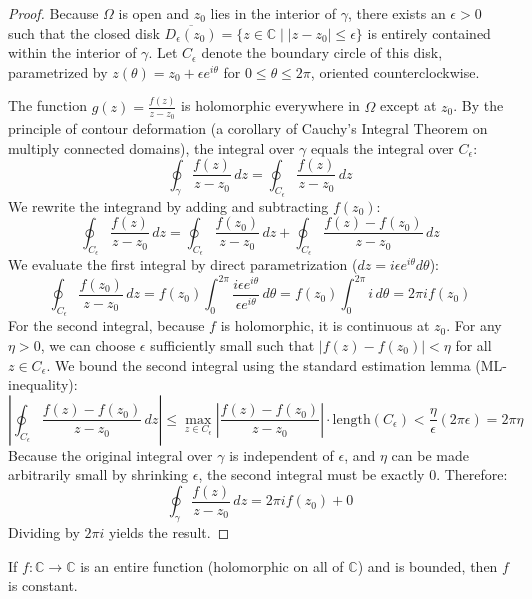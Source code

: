 \begin{proof}
Because $\Omega$ is open and $z_0$ lies in the interior of $\gamma$, there exists an $\epsilon > 0$ such that the closed disk $\overline{D_\epsilon(z_0)} = \{ z \in \mathbb{C} \mid |z - z_0| \le \epsilon \}$ is entirely contained within the interior of $\gamma$. Let $C_\epsilon$ denote the boundary circle of this disk, parametrized by $z(\theta) = z_0 + \epsilon e^{i\theta}$ for $0 \le \theta \le 2\pi$, oriented counterclockwise.

The function $g(z) = \frac{f(z)}{z - z_0}$ is holomorphic everywhere in $\Omega$ except at $z_0$. By the principle of contour deformation (a corollary of Cauchy's Integral Theorem on multiply connected domains), the integral over $\gamma$ equals the integral over $C_\epsilon$:
$$ \oint_\gamma \frac{f(z)}{z - z_0} \, dz = \oint_{C_\epsilon} \frac{f(z)}{z - z_0} \, dz $$
We rewrite the integrand by adding and subtracting $f(z_0)$:
$$ \oint_{C_\epsilon} \frac{f(z)}{z - z_0} \, dz = \oint_{C_\epsilon} \frac{f(z_0)}{z - z_0} \, dz + \oint_{C_\epsilon} \frac{f(z) - f(z_0)}{z - z_0} \, dz $$
We evaluate the first integral by direct parametrization ($dz = i \epsilon e^{i\theta} d\theta$):
$$ \oint_{C_\epsilon} \frac{f(z_0)}{z - z_0} \, dz = f(z_0) \int_0^{2\pi} \frac{i \epsilon e^{i\theta}}{\epsilon e^{i\theta}} \, d\theta = f(z_0) \int_0^{2\pi} i \, d\theta = 2\pi i f(z_0) $$
For the second integral, because $f$ is holomorphic, it is continuous at $z_0$. For any $\eta > 0$, we can choose $\epsilon$ sufficiently small such that $|f(z) - f(z_0)| < \eta$ for all $z \in C_\epsilon$. We bound the second integral using the standard estimation lemma (ML-inequality):
$$ \left| \oint_{C_\epsilon} \frac{f(z) - f(z_0)}{z - z_0} \, dz \right| \le \max_{z \in C_\epsilon} \left| \frac{f(z) - f(z_0)}{z - z_0} \right| \cdot \text{length}(C_\epsilon) < \frac{\eta}{\epsilon} (2\pi \epsilon) = 2\pi \eta $$
Because the original integral over $\gamma$ is independent of $\epsilon$, and $\eta$ can be made arbitrarily small by shrinking $\epsilon$, the second integral must be exactly $0$. Therefore:
$$ \oint_\gamma \frac{f(z)}{z - z_0} \, dz = 2\pi i f(z_0) + 0 $$
Dividing by $2\pi i$ yields the result.
\end{proof}

\begin{theorem}
If $f: \mathbb{C} \to \mathbb{C}$ is an entire function (holomorphic on all of $\mathbb{C}$) and is bounded, then $f$ is constant.
\end{theorem}

